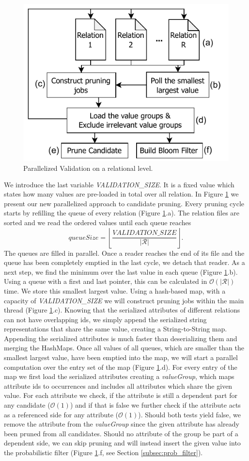 \begin{figure}
    \centering
    \includegraphics[width=.38\textwidth]{figures/multi_validation.pdf}
    \caption{Parallelized Validation on a relational level.}
    \label{fig:parallel_validation}
\end{figure}

We introduce the last variable \textit{VALIDATION\_SIZE}. It is a fixed value which states how many values are pre-loaded in total over all relation. In Figure \ref{fig:parallel_validation} we present our new parallelized approach to candidate pruning. Every pruning cycle starts by refilling the queue of every relation (Figure \ref{fig:parallel_validation}.a). The relation files are sorted and we read the ordered values until each queue reaches $$
\textit{queueSize} = \left \lfloor \frac{\textit{VALIDATION\_SIZE}}{|\mathcal{R}|} \right \rfloor. 
$$
The queues are filled in parallel. Once a reader reaches the end of its file and the queue has been completely emptied in the last cycle, we detach that reader. As a next step, we find the minimum over the last value in each queue (Figure \ref{fig:parallel_validation}.b). Using a queue with a first and last pointer, this can be calculated in $\mathcal{O}(|\mathcal{R}|)$ time. We store this smallest largest value. Using a hash-based map, with a capacity of \textit{VALIDATION\_SIZE} we will construct pruning jobs within the main thread (Figure \ref{fig:parallel_validation}.c). Knowing that the serialized attributes of different relations can not have overlapping ids, we simply append the serialized string representations that share the same value, creating a String-to-String map. Appending the serialized attributes is much faster than deserializing them and merging the HashMaps. Once all values of all queues, which are smaller than the smallest largest value, have been emptied into the map, we will start a parallel computation over the entry set of the map (Figure \ref{fig:parallel_validation}.d). For every entry of the map we first load the serialized attributes creating a \textit{valueGroup}, which maps attribute ids to occurrences and includes all attributes which share the given value. For each attribute we check, if the attribute is still a dependent part for any candidate ($\mathcal{O}(1)$) and if that is false we further check if the attribute acts as a referenced side for any attribute ($\mathcal{O}(1)$). Should both tests yield false, we remove the attribute from the \textit{valueGroup} since the given attribute has already been pruned from all candidates. Should no attribute of the group be part of a dependent side, we can skip pruning and will instead insert the given value into the probabilistic filter (Figure \ref{fig:parallel_validation}.f, see Section \ref{subsec:prob_filter}).
